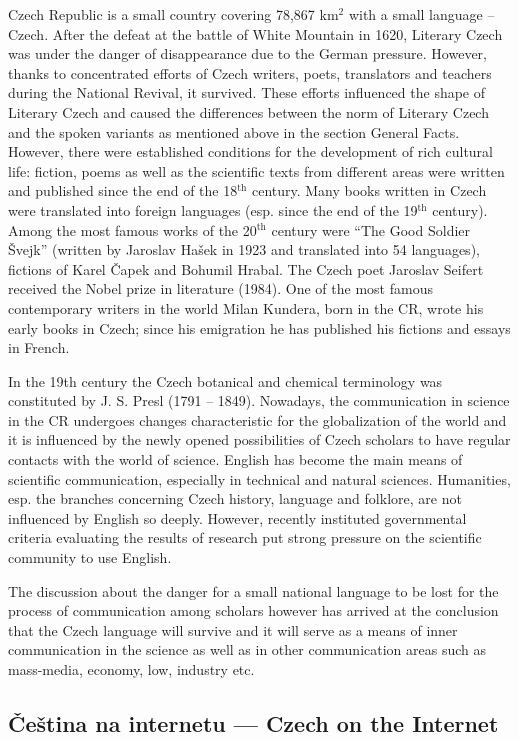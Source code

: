 \documentclass[]{../../metanetpaper}
\begin{document}
\begin{multicols}{2}
Czech Republic is a small country covering 78,867 km$^{\textrm{2}}$ with a small language – Czech. After the defeat at the battle of White Mountain in 1620, Literary Czech was under the danger of disappearance due to the German pressure. However, thanks to concentrated efforts of Czech writers, poets, translators and teachers during the National Revival, it survived. These efforts influenced the shape of Literary Czech and caused the differences between the norm of Literary Czech and the spoken variants as mentioned above in the section General Facts. However, there were established conditions for the development of rich cultural life: fiction, poems as well as the scientific texts from different areas were written and published since the end of the 18$^{\textrm{th}}$ century. Many books written in Czech were translated into foreign languages (esp. since the end of the 19$^{\textrm{th}}$ century). Among the most famous works of the 20$^{\textrm{th}}$  century were “The Good Soldier Švejk” (written by Jaroslav Hašek in 1923 and translated into 54 languages), fictions of Karel Čapek and Bohumil Hrabal. The Czech poet Jaroslav Seifert received the Nobel prize in literature (1984). One of the most famous contemporary writers in the world Milan Kundera, born in the CR, wrote his early books in Czech; since his emigration he has published his fictions and essays in French.

In the 19th century the Czech botanical and chemical terminology was constituted by J. S. Presl (1791 – 1849). Nowadays, the communication in science in the CR undergoes changes characteristic for the globalization of the world and it is influenced by the newly opened possibilities of Czech scholars to have regular contacts with the world of science. English has become the main means of scientific communication, especially in technical and natural sciences. Humanities, esp. the branches concerning Czech history, language  and folklore, are not influenced by English so deeply. However, recently instituted governmental criteria evaluating the results of research put strong pressure on the scientific community to use English.

The discussion about the danger for a small national language to be lost for the process of communication among scholars however has arrived at the conclusion that the Czech language will survive and it will serve as a means of inner communication in the science as well as in other communication areas such as mass-media, economy, low, industry etc.
  
\subsection{Čeština na internetu --- Czech on the Internet}


\end{multicols}
\end{document}
